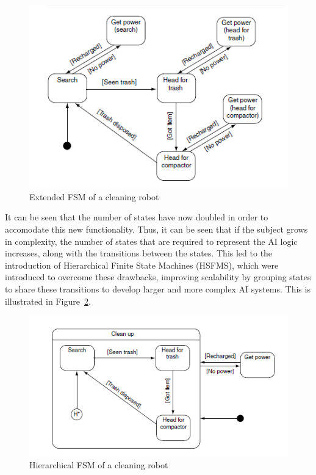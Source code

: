         \begin{figure}[htp]
            \begin{center}
            \includegraphics[scale=0.5]{images/fsm2.png}
            \caption{Extended FSM of a cleaning robot}
            \label{img:fsm2}
            \end{center} 
        \end{figure}
        
        It can be seen that the number of states have now doubled in order to accomodate this new functionality. Thus, it can be seen that if the subject grows in complexity, the number of states that are required to represent the AI logic increases, along with the transitions between the states. This led to the introduction of Hierarchical Finite State Machines (HSFMS), which were introduced to overcome these drawbacks, improving scalability by grouping states to share these transitions to develop larger and more complex AI systems. This is illustrated in Figure~\ref{img:hfsm}. 
                      
        \begin{figure}[htp]
            \begin{center}
            \includegraphics[scale=0.5]{images/hfsm.png}
            \caption{Hierarchical FSM of a cleaning robot}
            \label{img:hfsm}
            \end{center} 
        \end{figure}

